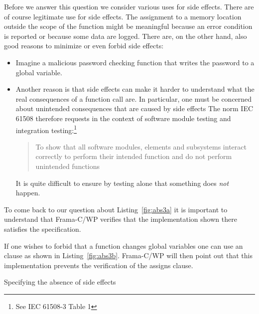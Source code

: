 \FloatBarrier

Before we answer this question we consider various uses for side effects.
There are of course legitimate use for side effects.
The assignment to a memory location outside the scope of the function
might be meaningful because an error condition is reported or because
some data are logged.
There are, on the other hand, also good reasons to minimize or even forbid side 
effects:

\begin{itemize}
\item
Imagine a malicious password checking function that writes the password to
a global variable.

\item
Another reason is that side effects can make it harder to understand what 
the real consequences of a function call are.
In particular, one must be concerned about unintended consequences that
are caused by side effects
The norm IEC 61508 therefore requests in the context of software module testing
and integration testing:\footnote{%
   See IEC 61508-3 Table 1
}

\begin{quote}
To show that all software modules,
elements and subsystems interact correctly
to perform their intended function and do not perform unintended functions
\end{quote}

It is quite difficult to ensure by testing alone that something does \emph{not}
happen.
\end{itemize}

To come back to our question about Listing~\ref{fig:abs3a} it is important
to understand that Frama-C\slash WP verifies that the implementation shown there
satisfies the specification.

\clearpage 

If one wishes to forbid that a function changes global variables
one can use an  clause as shown in Listing~\ref{fig:abs3b}.
Frama-C\slash WP will then point out that this implementation prevents
the verification of the assigns clause.

\begin{listing}[hbt]
\begin{minipage}{\textwidth}

\end{minipage}
\caption{\label{fig:abs3b} Specifying the absence of side effects}
\end{listing}

